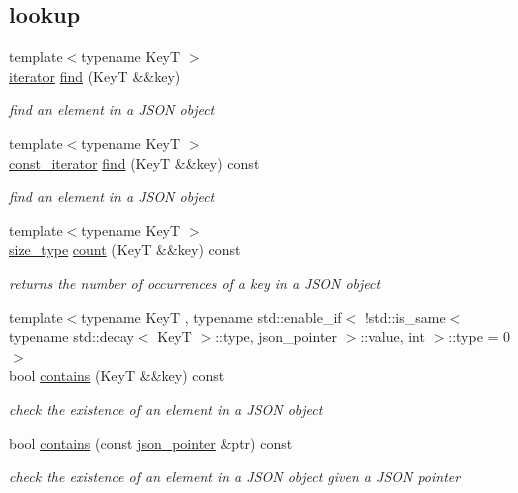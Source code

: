 \subsection*{lookup}
\begin{DoxyCompactItemize}
\item 
{\footnotesize template$<$typename KeyT $>$ }\\\hyperlink{classnlohmann_1_1basic__json_aa549b2b382916b3baafb526e5cb410bd}{iterator} \hyperlink{classnlohmann_1_1basic__json_acdf9b3aab82dcf443dd91ca5ec06b80c}{find} (KeyT \&\&key)
\begin{DoxyCompactList}\small\item\em find an element in a J\+S\+ON object \end{DoxyCompactList}\item 
{\footnotesize template$<$typename KeyT $>$ }\\\hyperlink{classnlohmann_1_1basic__json_aebd2cfa7e4ded4e97cde9269bfeeea38}{const\+\_\+iterator} \hyperlink{classnlohmann_1_1basic__json_ae1a977c697c8d05267a8238a097af2a3}{find} (KeyT \&\&key) const 
\begin{DoxyCompactList}\small\item\em find an element in a J\+S\+ON object \end{DoxyCompactList}\item 
{\footnotesize template$<$typename KeyT $>$ }\\\hyperlink{classnlohmann_1_1basic__json_a3ada29bca70b4965f6fd37ec1c8f85f7}{size\+\_\+type} \hyperlink{classnlohmann_1_1basic__json_a3cad8946e72de473ac99e610a3cc9494}{count} (KeyT \&\&key) const 
\begin{DoxyCompactList}\small\item\em returns the number of occurrences of a key in a J\+S\+ON object \end{DoxyCompactList}\item 
{\footnotesize template$<$typename KeyT , typename std\+::enable\+\_\+if$<$ !std\+::is\+\_\+same$<$ typename std\+::decay$<$ Key\+T $>$\+::type, json\+\_\+pointer $>$\+::value, int $>$\+::type  = 0$>$ }\\bool \hyperlink{classnlohmann_1_1basic__json_a2a8dc024698f32cf8b01b2de93835202}{contains} (KeyT \&\&key) const 
\begin{DoxyCompactList}\small\item\em check the existence of an element in a J\+S\+ON object \end{DoxyCompactList}\item 
bool \hyperlink{classnlohmann_1_1basic__json_a05dcbc1fe9139b8e1cf2b8212d9dba96}{contains} (const \hyperlink{classnlohmann_1_1basic__json_aa8f1f93b32da01b42413643be32b2c27}{json\+\_\+pointer} \&ptr) const 
\begin{DoxyCompactList}\small\item\em check the existence of an element in a J\+S\+ON object given a J\+S\+ON pointer \end{DoxyCompactList}\end{DoxyCompactItemize}
